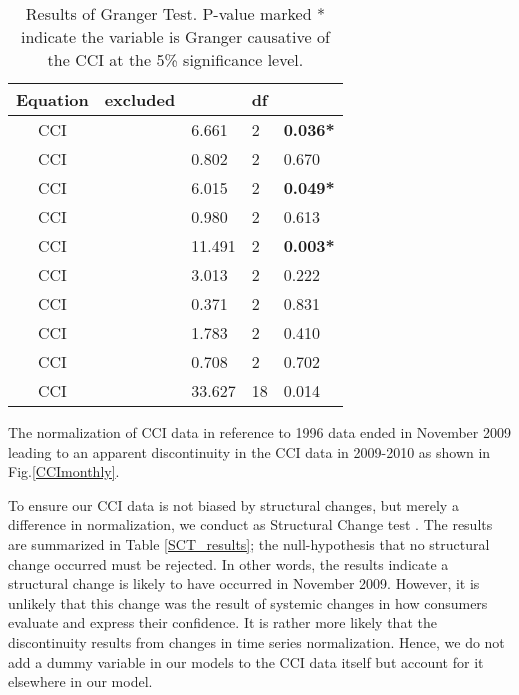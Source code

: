 \documentclass[10pt]{article}
\begin{document}
\begin {table}
\begin {center}
\begin {tabular} {cllll}
\hline
Equation	&	excluded	&		&	df	&		\\
\hline
CCI	&		&	6.661	&	2	&	\textbf{0.036*}	\\
CCI	&		&	0.802	&	2	&	0.670	 	\\
CCI	&		&	6.015	&	2	&	\textbf{0.049*}	\\
CCI	&		&	0.980	&	2	&	0.613		\\
CCI	&		&	11.491	&	2	&	\textbf{0.003*}	\\
CCI	&		&	3.013	&	2	&	0.222		\\
CCI	&		&	0.371	&	2	&	0.831		\\
CCI	&		&	1.783	&	2	&	0.410		\\
CCI	&		&	0.708	&	2	&	0.702		\\
CCI	&	     &	33.627	&	18	&	0.014		\\
\hline
\end {tabular}
\caption{ \label{Granger} Results of Granger Test. P-value marked * indicate the variable is Granger causative of the CCI at the 5\% significance level.}
\end {center}
\end {table}


The normalization of CCI data in reference to 1996 data \cite{Center2010} ended in November 2009 leading to an apparent discontinuity in the CCI data in 2009-2010 as shown in Fig.\ref{CCImonthly}.

To ensure our CCI data is not biased by structural changes, but merely a difference in normalization, we conduct as Structural Change test \cite{Pasinetti1981}. The results are summarized in Table \ref{SCT_results}; the null-hypothesis that no structural change occurred must be rejected. In other words, the results indicate a structural change is likely to have occurred in November 2009. However, it is unlikely that this change was the result of systemic changes in how consumers evaluate and express their confidence. It is rather more likely that the discontinuity results from changes in time series normalization. Hence, we do not add a dummy variable in our models to the CCI data itself but account for it elsewhere in our model.\\
\end{document}
